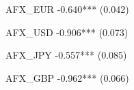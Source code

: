 AFX_EUR                    -0.640***                                                                                                                                                                                                         
                            (0.042)                                                                                                                                                                                                          
                                                                                                                                                                                                                                             
AFX_USD                                            -0.906***                                                                                                                                                                                 
                                                    (0.073)                                                                                                                                                                                  
                                                                                                                                                                                                                                             
AFX_JPY                                                                    -0.557***                                                                                                                                                         
                                                                            (0.085)                                                                                                                                                          
                                                                                                                                                                                                                                             
AFX_GBP                                                                                            -0.962***                                                                                                                                 
                                                                                                    (0.066)                                                                                                                                  
                                                                                                                                                                                                                                             
